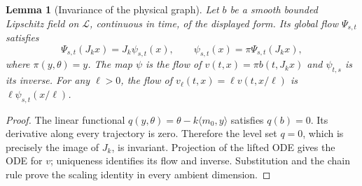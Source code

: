 \documentclass[11pt]{article}
\newtheorem{lemma}[theorem]{Lemma}
\theoremstyle{definition}
\begin{document}
\begin{lemma}[Invariance of the physical graph]\label{lem:graph-invariant}
Let $b$ be a smooth bounded Lipschitz field on $\mathcal L$, continuous
in time, of the displayed form. Its global flow $\Psi_{s,t}$ satisfies
\[
 \Psi_{s,t}(J_kx)=J_k\psi_{s,t}(x),\qquad
 \psi_{s,t}(x)=\pi\Psi_{s,t}(J_kx),
\]
where $\pi(y,\theta)=y$. The map $\psi$ is the flow of
$v(t,x)=\pi b(t,J_kx)$ and $\psi_{t,s}$ is its inverse.
For any $\ell>0$, the flow of
$v_\ell(t,x)=\ell v(t,x/\ell)$ is
$\ell\psi_{s,t}(x/\ell)$.
\end{lemma}
\begin{proof}
The linear functional $q(y,\theta)=\theta-k\langle m_0,y\rangle$
satisfies $q(b)=0$. Its derivative along every trajectory is zero.
Therefore the level set $q=0$, which is precisely the image of $J_k$,
is invariant. Projection of the lifted ODE gives the ODE for
$v$; uniqueness identifies its flow and inverse. Substitution and the chain rule prove the scaling identity in every
ambient dimension.
\end{proof}
\end{document}
